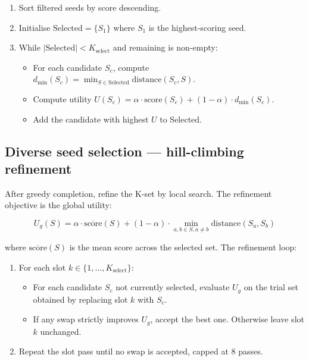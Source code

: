 \documentclass[11pt,a4paper]{article}
\begin{document}
\begin{enumerate}[leftmargin=*]
  \item Sort filtered seeds by score descending.
  \item Initialise $\text{Selected} = \{S_1\}$ where $S_1$ is the highest-scoring seed.
  \item While $|\text{Selected}| < K_{\text{select}}$ and remaining is non-empty:
    \begin{itemize}
      \item For each candidate $S_c$, compute $d_{\min}(S_c) = \min_{S \in \text{Selected}} \text{distance}(S_c, S)$.
      \item Compute utility $U(S_c) = \alpha \cdot \text{score}(S_c) + (1 - \alpha) \cdot d_{\min}(S_c)$.
      \item Add the candidate with highest $U$ to Selected.
    \end{itemize}
\end{enumerate}

\subsection{Diverse seed selection — hill-climbing refinement}

After greedy completion, refine the K-set by local search. The refinement objective is the global utility:

\begin{equation}
U_g(S) = \alpha \cdot \overline{\text{score}}(S) + (1 - \alpha) \cdot \min_{a, b \in S, a \ne b} \text{distance}(S_a, S_b)
\end{equation}

where $\overline{\text{score}}(S)$ is the mean score across the selected set. The refinement loop:

\begin{enumerate}[leftmargin=*]
  \item For each slot $k \in \{1, \ldots, K_{\text{select}}\}$:
    \begin{itemize}
      \item For each candidate $S_c$ not currently selected, evaluate $U_g$ on the trial set obtained by replacing slot $k$ with $S_c$.
      \item If any swap strictly improves $U_g$, accept the best one. Otherwise leave slot $k$ unchanged.
    \end{itemize}
  \item Repeat the slot pass until no swap is accepted, capped at 8 passes.
\end{enumerate}
\end{document}
